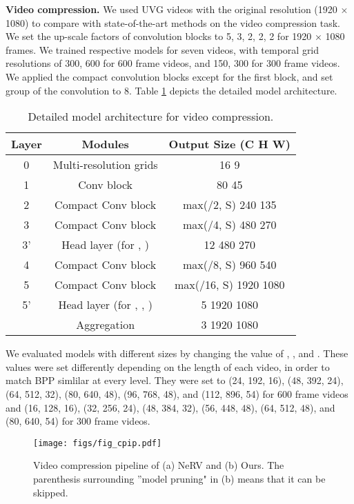 \documentclass[sigconf]{acmart}
\begin{document}
\noindent\textbf{Video compression.}
We used UVG videos with the original resolution (1920 × 1080) to compare with state-of-the-art methods on the video compression task.
We set the up-scale factors of convolution blocks to 5, 3, 2, 2, 2 for 1920 × 1080 frames.
We trained respective models for seven videos, with temporal grid resolutions of 300, 600 for 600 frame videos, and 150, 300 for 300 frame videos.
We applied the compact convolution blocks except for the first block, and set group of the convolution to 8.
Table \ref{tab_co} depicts the detailed model architecture.

\begin{table}[ht]
\centering
\caption{Detailed model architecture for video compression.}
\vskip 0.1in
\begin{tabular}{c|c|c}
\hline
Layer & Modules                    & Output Size (C  H  W)    \\ \hline\hline
0     & Multi-resolution grids     &   16  9                 \\
1     & Conv block                 &   80 45                \\
2     & Compact Conv block              & max(/2, S) 240 135    \\
3     & Compact Conv block              & max(/4, S) 480 270    \\
3'    & Head layer (for , )     & 12 480 270             \\
4     & Compact Conv block              & max(/8, S) 960 540    \\
5     & Compact Conv block              & max(/16, S) 1920 1080 \\
5'    & Head layer (for , , ) & 5 1920 1080  \\       
& Aggregation & 3 1920 1080 \\
\hline
\end{tabular}
\label{tab_co}
\end{table}

We evaluated models with different sizes by changing the value of , , and .
These values were set differently depending on the length of each video, in order to match BPP simlilar at every level.
They were set to (24, 192, 16), (48, 392, 24), (64, 512, 32), (80, 640, 48), (96, 768, 48), and (112, 896, 54) for 600 frame videos and (16, 128, 16), (32, 256, 24), (48, 384, 32), (56, 448, 48), (64, 512, 48), and (80, 640, 54) for 300 frame videos.

\begin{figure}[ht]
\begin{center}
\texttt{[image: figs/fig\_cpip.pdf]}
\end{center}
   \caption{Video compression pipeline of (a) NeRV and (b) Ours. The parenthesis surrounding ''model pruning" in (b) means that it can be skipped.}
\label{fig_cpip}
\end{figure}
\end{document}
